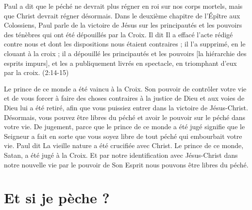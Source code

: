 Paul a dit que le péché ne devrait plus régner en roi sur nos corps mortels,
 mais que Christ devrait régner désormais.
 Dans le deuxième chapitre de l'Épître aux Colossiens,
 Paul parle de la victoire de Jésus sur les principautés et les pouvoirs
 des ténèbres qui ont été dépouillés par la Croix. Il dit\frcolon{}
 \Og Il a effacé l'acte rédigé contre nous et dont les dispositions
 nous étaient contraires ; il l'a supprimé, en le clouant à la croix ;
 il a dépouillé les principautés et les pouvoirs
 [la hiérarchie des esprits impurs],
 et les a publiquement livrés en spectacle, en triomphant d'eux
 par la croix.  \Fg{} (2:14-15)

Le prince de ce monde a été vaincu à la Croix.
 Son pouvoir de contrôler votre vie et de vous forcer à faire des choses
 contraires à la justice de Dieu et aux voies de Dieu lui a été retiré,
 afin que vous puissiez entrer dans la victoire de Jésus-Christ.
 Désormais, vous pouvez être libres du péché et avoir le pouvoir
 sur le péché dans votre vie.
 \Og De jugement, parce que le prince de ce monde a été jugé \Fg{}
 signifie que le Seigneur a fait en sorte que vous soyez libre de tout péché
 qui embourbait votre vie. Paul dit\frcolon{}
 \Og La vieille nature a été crucifiée avec Christ. \Fg{}
 Le prince de ce monde, Satan, a été jugé à la Croix.
 Et par notre identification avec Jésus-Christ dans notre nouvelle vie
 \ocadr par le pouvoir de Son Esprit \fcadr{}
 nous pouvons être libres du péché.

\section{Et si je p\`eche ?}

